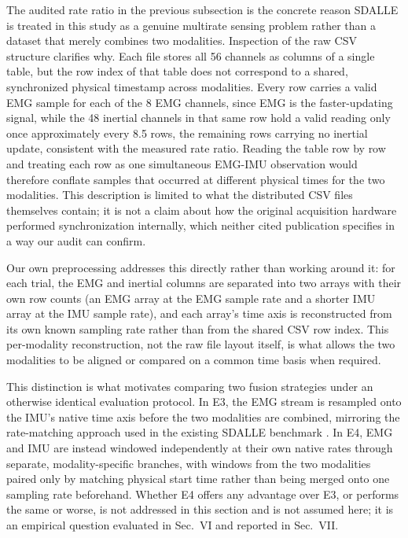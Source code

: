 \documentclass[conference]{IEEEtran}
\begin{document}
The audited rate ratio in the previous subsection is the concrete
reason SDALLE is treated in this study as a genuine multirate
sensing problem rather than a dataset that merely combines two
modalities. Inspection of the raw CSV structure clarifies why. Each
file stores all 56 channels as columns of a single table, but the
row index of that table does not correspond to a shared, synchronized
physical timestamp across modalities. Every row carries a valid EMG
sample for each of the 8 EMG channels, since EMG is the
faster-updating signal, while the 48 inertial channels in that same
row hold a valid reading only once approximately every 8.5 rows, the
remaining rows carrying no inertial update, consistent with the
measured rate ratio. Reading the table row by row and treating each
row as one simultaneous EMG-IMU observation would therefore conflate
samples that occurred at different physical times for the two
modalities. This description is limited to what the distributed CSV
files themselves contain; it is not a claim about how the original
acquisition hardware performed synchronization internally, which
neither cited publication specifies in a way our audit can confirm.

Our own preprocessing addresses this directly rather than working
around it: for each trial, the EMG and inertial columns are
separated into two arrays with their own row counts (an EMG array at
the EMG sample rate and a shorter IMU array at the IMU sample rate),
and each array's time axis is reconstructed from its own known
sampling rate rather than from the shared CSV row index. This
per-modality reconstruction, not the raw file layout itself, is what
allows the two modalities to be aligned or compared on a common time
basis when required.

This distinction is what motivates comparing two fusion strategies
under an otherwise identical evaluation protocol. In E3, the EMG
stream is resampled onto the IMU's native time axis before the two
modalities are combined, mirroring the rate-matching approach used
in the existing SDALLE benchmark \cite{farouk2026sdalle}. In E4,
EMG and IMU are instead windowed independently at their own native
rates through separate, modality-specific branches, with windows
from the two modalities paired only by matching physical start time
rather than being merged onto one sampling rate beforehand. Whether
E4 offers any advantage over E3, or performs the same or worse, is
not addressed in this section and is not assumed here; it is an
empirical question evaluated in Sec.~VI and reported in Sec.~VII.
\end{document}
